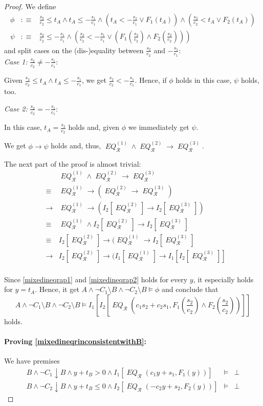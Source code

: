 \documentclass[a4paper]{article}
\theoremstyle{definition}
\newcommand\restrictB{\downarrow B}
\newcommand\withoutB{\setminus B}
\newcommand\defas{:\equiv}
\newcommand\mR{\mathcal{R}}
\newcommand\meq{\mathop{\mathit{EQ}}\nolimits}
\newcommand\meqr{\meq_\mR}
\newcommand\meqrone{\meq_\mR^{(1)}}
\newcommand\meqrtwo{\meq_\mR^{(2)}}
\newcommand\meqrthree{\meq_\mR^{(3)}}
\begin{document}
\begin{proof}
  We define 
  \begin{eqnarray*}
    \phi&\defas&\frac{s_2}{c_2}\le t_A\wedge t_A\le-\frac{s_1}{c_1}\wedge(t_A<-\frac{s_1}{c_1}\vee F_1(t_A))\wedge(\frac{s_2}{c_2}<t_A\vee F_2(t_A))\\
    \psi&\defas&\frac{s_2}{c_2}\le-\frac{s_1}{c_1}\wedge(\frac{s_2}{c_2}<-\frac{s_1}{c_1}\vee(F_1(\frac{s_2}{c_2})\wedge F_2(\frac{s_2}{c_2})))
    \end{eqnarray*}
  and split cases on the (dis-)equality between $\frac{s_2}{c_2}$ and $-\frac{s_1}{c_1}$:\\
  \emph{Case 1:} $\frac{s_2}{c_2}\ne -\frac{s_1}{c_1}$:

  Given $\frac{s_2}{c_2}\le t_A\wedge t_A\le-\frac{s_1}{c_1}$, we get $\frac{s_2}{c_2}<-\frac{s_1}{c_1}$.
  Hence, if $\phi$ holds in this case, $\psi$ holds, too.

  \noindent\emph{Case 2:} $\frac{s_2}{c_2}=-\frac{s_1}{c_1}$:

  In this case, $t_A=\frac{s_2}{c_2}$ holds and, given $\phi$ we immediately get $\psi$.

  We get $\phi\rightarrow\psi$ holds and, thus, $\meqrone\wedge\meqrtwo\rightarrow\meqrthree$.
  
  The next part of the proof is almost trivial:
  \begin{eqnarray*}
    &&\meqrone\wedge\meqrtwo\rightarrow\meqrthree\\
    &\equiv&\meqrone\rightarrow(\meqrtwo\rightarrow\meqrthree)\\
    &\rightarrow&\meqrone\rightarrow(I_2[\meqrtwo]\rightarrow I_2[\meqrthree])\\
    &\equiv&\meqrone\wedge I_2[\meqrtwo]\rightarrow I_2[\meqrthree]\\
    &\equiv&I_2[\meqrtwo]\rightarrow(\meqrone\rightarrow I_2[\meqrthree]\\
    &\rightarrow&I_2[\meqrtwo]\rightarrow(I_1[\meqrone]\rightarrow I_1[I_2[\meqrthree]]\\
  \end{eqnarray*}

  Since \ref{mixedineqrap1} and \ref{mixedineqrap2} holds for every $y$, it especially holds for $y=t_A$.
  Hence, it get $A\wedge\neg C_1\withoutB\wedge\neg C_2\withoutB\models\phi$ and conclude that 
  \[
  A\wedge\neg C_1\withoutB\wedge\neg C_2\withoutB\models I_1[I_2[\meqr(c_1s_2+c_2s_1,F_1(\frac{s_2}{c_2})\wedge F_2(\frac{s_2}{c_2}))]]
  \]
  holds.

  \paragraph{Proving \ref{mixedineqrinconsistentwithB}:}
  We have premises
  \begin{eqnarray}
    B\wedge\neg C_1\restrictB\wedge y+t_B>0\wedge I_1[\meqr(c_1y+s_1,F_1(y))]&\models&\bot\label{mixedineqrbp1}\\
    B\wedge\neg C_2\restrictB\wedge y+t_B\le0\wedge I_2[\meqr(-c_2y+s_2,F_2(y))]&\models&\bot\label{mixedineqrbp2}
  \end{eqnarray}


\end{proof}
\end{document}
